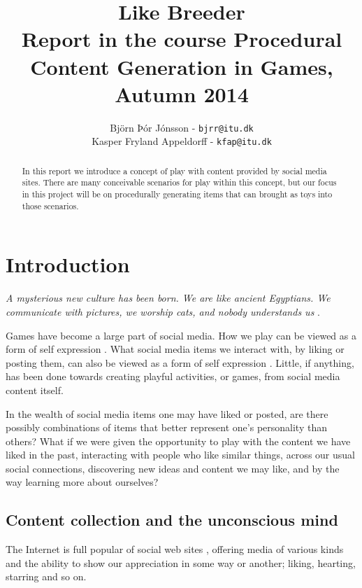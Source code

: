 \documentclass[]{article}
\title{Like Breeder\\ \small Report in the course Procedural Content Generation in Games, Autumn 2014}
\author{Björn Þór Jónsson - \texttt{bjrr@itu.dk}\\Kasper Fryland Appeldorff - \texttt{kfap@itu.dk}}
\begin{document}

\maketitle
\listoftodos %
\newpage
\begin{abstract}
In this report we introduce a concept of play with content provided by social media sites.  There are many conceivable scenarios for play within this concept, but our focus in this project will be on procedurally generating items that can brought as toys into those scenarios.
\end{abstract}



\section{Introduction}
\label{sec:Introduction}

\begin{center}
\textit{A mysterious new culture has been born. We are like ancient Egyptians. We communicate with pictures, we worship cats, and nobody understands us} \cite{gross2013makes}.
\end{center}


Games have become a large part of social media.  How we play can be viewed as a form of self expression \cite{sicart2014play}.  What social media items we interact with, by liking or posting them, can also be viewed as a form of self expression \cite{bargh2002can}.  Little, if anything, has been done towards creating playful activities, or games, from social media content itself.

In the wealth of social media items one may have liked or posted, are there possibly
combinations of items that better represent one's personality than others?  What if we were given the opportunity to play with the content we have liked in the past, interacting with people who like similar things, across our usual social connections, discovering new ideas and content we may like, and by the way learning more about ourselves?


\subsection{Content collection and the unconscious mind}

The Internet is full popular of social web sites \cite{LeadingSocialNetworks}, offering media of various kinds and the ability to show our appreciation in some way or another; liking, hearting, starring and so on.
\end{document}

